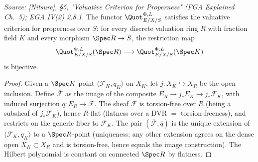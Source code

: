 \begin{lemma}
  \label{lem:quot_valuative_criterion}
  \textit{Source: [Nitsure], \S 5, "Valuative Criterion for Properness"
  (FGA Explained Ch.~5); EGA IV(2) 2.8.1.}
  The functor \(\Quot^{\Phi,L}_{E/X/S}\) satisfies the valuative criterion
  for properness over \(S\): for every discrete valuation ring \(R\) with
  fraction field \(K\) and every morphism \(\Spec R \to S\), the restriction
  map
  \[
    \Quot^{\Phi,L}_{E/X/S}(\Spec R)
    \longrightarrow
    \Quot^{\Phi,L}_{E/X/S}(\Spec K)
  \]
  is bijective.
\end{lemma}

\begin{proof}
  
  Given a \(\Spec K\)-point \(\langle \mathcal{F}_K, q_K\rangle\) on \(X_K\),
  let \(j : X_K \hookrightarrow X_R\) be the open inclusion. Define
  \(\overline{\mathcal{F}}\) as the image of the composite
  \(E_R \to j_* E_K \to j_* \mathcal{F}_K\), with induced surjection
  \(\overline{q} : E_R \to \overline{\mathcal{F}}\). The sheaf
  \(\overline{\mathcal{F}}\) is torsion-free over \(R\) (being a subsheaf of
  \(j_* \mathcal{F}_K\)), hence \(R\)-flat (flatness over a DVR
  \(=\) torsion-freeness), and restricts on the generic fiber to
  \(\mathcal{F}_K\). The pair \((\overline{\mathcal{F}}, \overline{q})\) is
  the unique extension of \(\langle \mathcal{F}_K, q_K\rangle\) to a
  \(\Spec R\)-point (uniqueness: any other extension agrees on the dense
  open \(X_K \subset X_R\) and is torsion-free, hence equals the image
  construction). The Hilbert polynomial is constant on connected
  \(\Spec R\) by flatness.
\end{proof}

